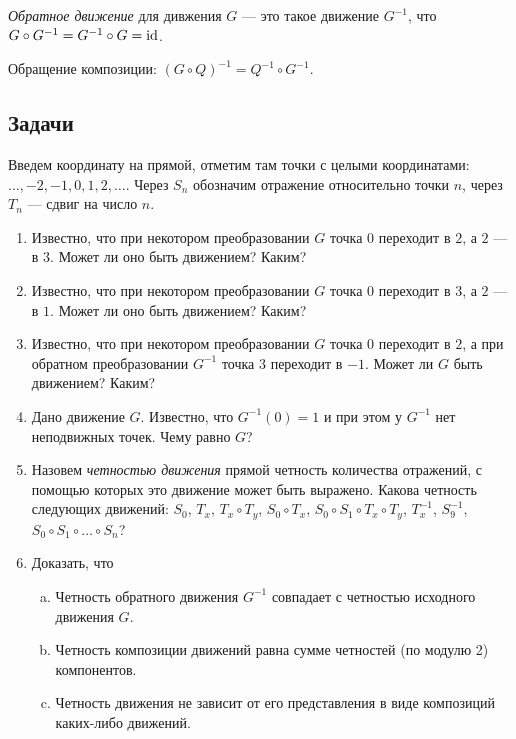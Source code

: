 \textit{Обратное движение} для дивжения $G$ --- это такое движение $G^{-1}$, что $G\circ G^{-1}=G^{-1}\circ G=\mathrm{id}$.

Обращение композиции: $(G\circ Q)^{-1} = Q^{-1}\circ G^{-1}$.

\subsection*{Задачи}

Введем координату на прямой, отметим там точки с целыми координатами: $\dots,-2,-1,0,1,2,\dots$. Через $S_n$ обозначим отражение относительно точки $n$, через $T_n$ --- сдвиг на число $n$.
\begin{enumerate}
\item Известно, что при некотором преобразовании $G$ точка $0$ переходит в $2$, а $2$ --- в $3$. Может ли оно быть движением? Каким?
\item Известно, что при некотором преобразовании $G$ точка $0$ переходит в $3$, а $2$ --- в $1$. Может ли оно быть движением? Каким?
\item Известно, что при некотором преобразовании $G$ точка $0$ переходит в $2$, а при обратном преобразовании $G^{-1}$ точка $3$ переходит в $-1$. Может ли $G$ быть движением? Каким?
\item Дано движение $G$. Известно, что $G^{-1}(0)=1$ и при этом у $G^{-1}$ нет неподвижных точек. Чему равно $G$?
\item Назовем \textit{четностью движения} прямой четность количества отражений, с помощью которых это движение может быть выражено. Какова четность следующих движений: $S_0$, $T_x$, $T_x\circ T_y$, $S_0\circ T_x$, $S_0\circ S_1\circ T_x\circ T_y$, $T_x^{-1}$, $S_9^{-1}$, $S_0\circ S_1\circ\dots\circ S_n$?
\item Доказать, что
\begin{enumerate}[a)]
\item Четность обратного движения  $G^{-1}$ совпадает с четностью исходного движения $G$.
\item Четность композиции движений равна сумме четностей (по модулю 2) компонентов.
\item Четность движения не зависит от его представления в виде композиций каких-либо движений.
\end{enumerate}
\end{enumerate}

